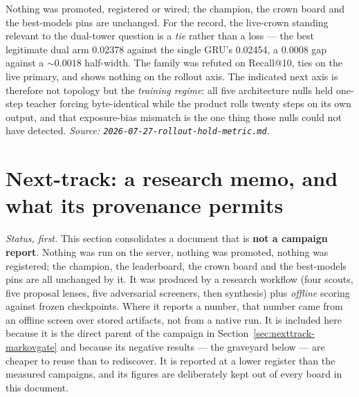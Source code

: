 \documentclass[11pt]{article}
\begin{document}
Nothing was promoted, registered or wired; the champion, the crown board and the
best-models pins are unchanged. For the record, the live-crown standing relevant
to the dual-tower question is a \emph{tie} rather than a loss --- the best
legitimate dual arm \num{0.02378} against the single GRU's \num{0.02454}, a
\num{0.0008} gap against a ${\sim}\num{0.0018}$ half-width. The family was refuted
on Recall@10, ties on the live primary, and shows nothing on the rollout axis.
The indicated next axis is therefore not topology but the \emph{training regime}:
all five architecture nulls held one-step teacher forcing byte-identical while the
product rolls twenty steps on its own output, and that exposure-bias mismatch is
the one thing those nulls could not have detected.
\emph{Source: \texttt{2026-07-27-rollout-hold-metric.md}.}

\section{Next-track: a research memo, and what its provenance permits}
\label{sec:nexttrack-memo}
\emph{Status, first.} This section consolidates a document that is \textbf{not a
campaign report}. Nothing was run on the server, nothing was promoted, nothing was
registered; the champion, the leaderboard, the crown board and the best-models
pins are all unchanged by it. It was produced by a research workflow (four scouts,
five proposal lenses, five adversarial screeners, then synthesis) plus
\emph{offline} scoring against frozen checkpoints. Where it reports a number, that
number came from an offline screen over stored artifacts, not from a native run.
It is included here because it is the direct parent of the campaign in
Section~\ref{sec:nexttrack-markovgate} and because its negative results --- the graveyard
below --- are cheaper to reuse than to rediscover. It is reported at a lower
register than the measured campaigns, and its figures are deliberately kept out of
every board in this document.
\end{document}
